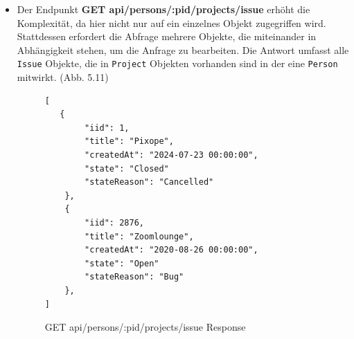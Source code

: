 \begin{itemize}
\begin{figure}[H]
\begin{center}
\begin{BVerbatim}
[
    {
        "pid": 1,
        "firstname": "Ruby",
        "lastname": "Burchatt",
        "email": "rburchatt0@msn.com"
    },
	[...]
    {
        "pid": 5000,
        "firstname": "Murdoch",
        "lastname": "Simonitto",
        "email": "msimonittorr@google.ca"
    }
]
\end{BVerbatim}
\end{center}
\caption{GET api/persons Response}
\end{figure}

\item Der Endpunkt \colorbox{gray!20}{\textbf{GET api/persons/:pid/projects/issue}} erhöht die Komplexität, da hier nicht nur auf ein einzelnes Objekt zugegriffen wird. Stattdessen erfordert die Abfrage mehrere Objekte, die miteinander in Abhängigkeit stehen, um die Anfrage zu bearbeiten. Die Antwort umfasst alle  \texttt{Issue} Objekte, die in  \texttt{Project} Objekten vorhanden sind in der eine  \texttt{Person} mitwirkt. (Abb. 5.11)
\begin{figure}[H]
\begin{center}
\begin{BVerbatim}
[
   {
        "iid": 1,
        "title": "Pixope",
        "createdAt": "2024-07-23 00:00:00",
        "state": "Closed"
        "stateReason": "Cancelled"
    },
    {
        "iid": 2876,
        "title": "Zoomlounge",
        "createdAt": "2020-08-26 00:00:00",
        "state": "Open"
        "stateReason": "Bug"
    },
]
\end{BVerbatim}
\end{center}
\caption{GET api/persons/:pid/projects/issue Response}
\end{figure}


\end{itemize}
